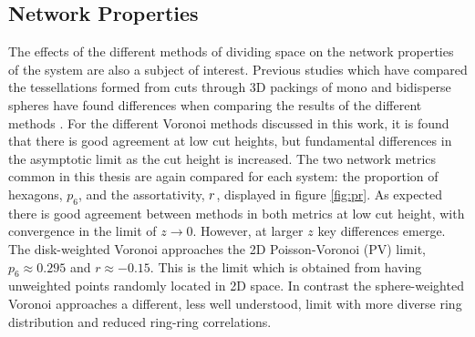 \subsection{Network Properties}

The effects of the different methods of dividing space on the network properties of the system are also a subject of interest.
Previous studies which have compared the tessellations formed from cuts through 3D packings of mono and bidisperse spheres have found differences when comparing the results of the different methods \cite{Oger2000,Gervois2004}.
For the different Voronoi methods discussed in this work, it is found that there is good agreement at low cut heights, but fundamental differences in the asymptotic limit as the cut height is increased.
The two network metrics common in this thesis are again compared for each system: the proportion of hexagons, $p_6$, and the assortativity, $r$, displayed in figure \ref{fig:pr}.
As expected there is good agreement between methods in both metrics at low cut height, with convergence in the limit of $z\rightarrow 0$.
However, at larger $z$ key differences emerge. 
The disk\--weighted Voronoi approaches the 2D Poisson\--Voronoi (PV) limit, $p_6\approx0.295$ and $r\approx -0.15$.
This is the limit which is obtained from having unweighted points randomly located in 2D space.
In contrast the sphere\--weighted Voronoi approaches a different, less well understood, limit with more diverse ring distribution and reduced ring\--ring correlations. %


